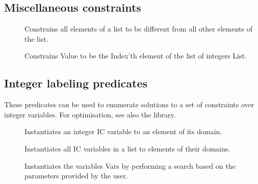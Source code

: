 \subsection{Miscellaneous constraints}

\begin{description}

\item
[]
Constrains all elements of a list to be different from all other
elements of the list.

\item
[]
Constrains Value to be the Index'th element of the list of integers List.

\end{description}


\subsection{Integer labeling predicates}

These predicates can be used to enumerate solutions to a set of constraints
over integer variables.  For optimisation, see also the
 library.

\begin{description}

\item []
Instantiates an integer IC variable to an element of its domain.

\item []
Instantiates all IC variables in a list to elements of their domains.

\item []
Instantiates the variables Vars by performing a search based on the
parameters provided by the user.

\end{description}



